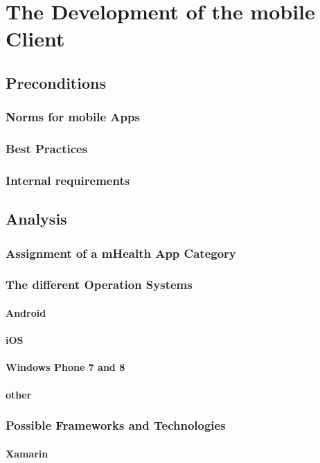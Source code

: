\section{The Development of the mobile Client}
\subsection{Preconditions}
\subsubsection{Norms for mobile Apps}
\subsubsection{Best Practices}
\subsubsection{Internal requirements}
\subsection{Analysis}
\subsubsection{Assignment of a mHealth App Category}
\subsubsection{The different Operation Systems}
\paragraph{Android}
\paragraph{iOS}
\paragraph{Windows Phone 7 and 8}
\paragraph{other}
\subsubsection{Possible Frameworks and Technologies}
\paragraph{Xamarin}
